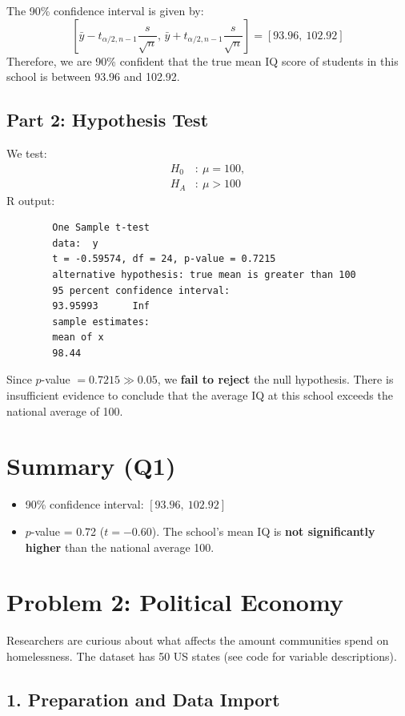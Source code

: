 \documentclass[11pt]{article}
\begin{document}
	The 90\% confidence interval is given by:
	\[
	\left[ \bar{y} - t_{\alpha/2, n-1} \frac{s}{\sqrt{n}},\, \bar{y} + t_{\alpha/2, n-1} \frac{s}{\sqrt{n}} \right] =
	[93.96,\ 102.92]
	\]
	Therefore, we are 90\% confident that the true mean IQ score of students in this school is between 93.96 and 102.92.
	
	\subsection*{Part 2: Hypothesis Test}
	
	We test:
	\[
	\begin{aligned}
		H_0 &:~ \mu = 100, \\
		H_A &:~ \mu > 100
	\end{aligned}
	\]
	R output:
	\begin{verbatim}
		One Sample t-test
		data:  y
		t = -0.59574, df = 24, p-value = 0.7215
		alternative hypothesis: true mean is greater than 100
		95 percent confidence interval:
		93.95993      Inf
		sample estimates:
		mean of x 
		98.44 
	\end{verbatim}
	
	Since $p$-value $= 0.7215 \gg 0.05$, we \textbf{fail to reject} the null hypothesis. There is insufficient evidence to conclude that the average IQ at this school exceeds the national average of 100.
	
	\section*{Summary (Q1)}
	\begin{itemize}
		\item 90\% confidence interval: $\left[93.96,\ 102.92\right]$
		\item $p$-value = 0.72 ($t = -0.60$). The school's mean IQ is \textbf{not significantly higher} than the national average 100.
	\end{itemize}
	
	\section*{Problem 2: Political Economy}
	
	Researchers are curious about what affects the amount communities spend on homelessness. The dataset has 50 US states (see code for variable descriptions).
	
	\subsection*{1. Preparation and Data Import}
	
\end{document}
